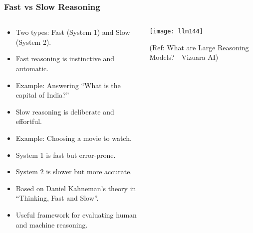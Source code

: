 \begin{frame}[fragile]\frametitle{Fast vs Slow Reasoning}

\begin{columns}
    \begin{column}[T]{0.6\linewidth}
		\begin{itemize}
		  \item Two types: Fast (System 1) and Slow (System 2).
		  \item Fast reasoning is instinctive and automatic.
		  \item Example: Answering “What is the capital of India?”
		  \item Slow reasoning is deliberate and effortful.
		  \item Example: Choosing a movie to watch.
		  \item System 1 is fast but error-prone.
		  \item System 2 is slower but more accurate.
		  \item Based on Daniel Kahneman's theory in ``Thinking, Fast and Slow''.
		  \item Useful framework for evaluating human and machine reasoning.
		\end{itemize}

    \end{column}
    \begin{column}[T]{0.4\linewidth}
		\begin{center}
		\texttt{[image: llm144]}
		
		{\tiny (Ref: What are Large Reasoning Models? - Vizuara AI)}
		
		\end{center}
    \end{column}
  \end{columns}
  
  



\end{frame}

